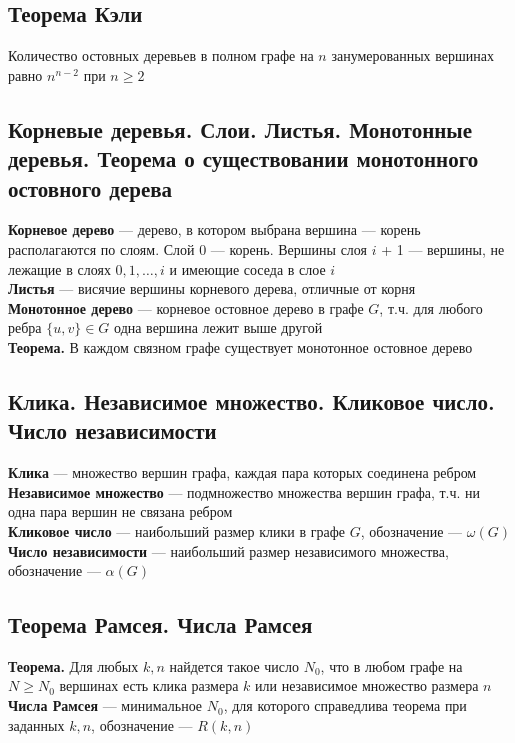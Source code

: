 \documentclass[a4paper]{article}
\begin{document}
\subsection{Теорема Кэли}
Количество остовных деревьев в полном графе на $n$ занумерованных вершинах равно $n^{n-2}$ при $n\geqslant2$

\subsection{Корневые деревья. Слои. Листья. Монотонные деревья. Теорема о существовании монотонного
остовного дерева}
\textbf{Корневое дерево} — дерево, в котором выбрана вершина — корень\\[2mm]
 располагаются по слоям. Слой 0 — корень. Вершины слоя $i$ + 1 — вершины, не лежащие в слоях $0, 1,\ldots,i$ и имеющие соседа в слое $i$\\[2mm]
\indent \textbf{Листья} — висячие вершины корневого дерева, отличные от корня\\[2mm]
\indent \textbf{Монотонное дерево} — корневое остовное дерево в графе $G$, т.ч. для любого ребра $\{u,v\}\in G$ одна вершина лежит выше другой\\[2mm]
\indent\textbf{Теорема.} В каждом связном графе существует монотонное остовное дерево

\subsection{Клика. Независимое множество. Кликовое число. Число независимости}
\textbf{Клика} — множество вершин графа, каждая пара которых соединена ребром\\[2mm]
\indent \textbf{Независимое множество} — подмножество множества вершин графа, т.ч. ни одна пара вершин не связана ребром\\[2mm]
\indent \textbf{Кликовое число} — наибольший размер клики в графе $G$, обозначение — $\omega(G)$\\[2mm]
\indent \textbf{Число независимости} — наибольший размер независимого множества, обозначение — $\alpha(G)$

\subsection{Теорема Рамсея. Числа Рамсея}
\textbf{Теорема.} Для любых $k,n$ найдется такое число $N_0$, что в любом графе на $N\geqslant N_0$ вершинах есть клика размера $k$ или независимое множество размера $n$\\[2mm]
\indent \textbf{Числа Рамсея} — минимальное $N_0$, для которого справедлива теорема при заданных $k,n$, обозначение — $R(k,n)$
\end{document}
